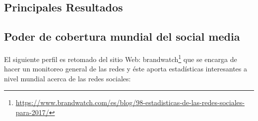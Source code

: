 
\begin{multicols}{2}
	
	\section{Principales Resultados}
	
	\subsection{Poder de cobertura mundial del social media}

El siguiente perfil es retomado del sitio Web: brandwatch\footnote{\href{https://www.brandwatch.com/es/blog/98-estadisticas-de-las-redes-sociales-para-2017/}{https://www.brandwatch.com/es/blog/98-estadisticas-de-las-redes-sociales-para-2017/}}  que se encarga de hacer un monitoreo general de las redes y éste aporta estadísticas interesantes a nivel mundial acerca de las redes sociales:

\end{multicols}